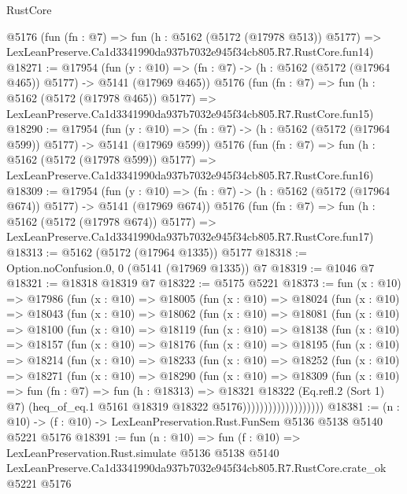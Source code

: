 \begin{lexlean}{RustCore}
\begin{coremodule}
    @5176
    (fun (fn : @7) =>
    fun (h : @5162 (@5172 (@17978 @513)) @5177) =>
    LexLeanPreserve.Ca1d3341990da937b7032e945f34cb805.R7.RustCore.fun14)
@18271 := @17954
    (fun (y : @10) => (fn : @7) -> (h : @5162 (@5172 (@17964 @465)) @5177) -> @5141 (@17969 @465))
    @5176
    (fun (fn : @7) =>
    fun (h : @5162 (@5172 (@17978 @465)) @5177) =>
    LexLeanPreserve.Ca1d3341990da937b7032e945f34cb805.R7.RustCore.fun15)
@18290 := @17954
    (fun (y : @10) => (fn : @7) -> (h : @5162 (@5172 (@17964 @599)) @5177) -> @5141 (@17969 @599))
    @5176
    (fun (fn : @7) =>
    fun (h : @5162 (@5172 (@17978 @599)) @5177) =>
    LexLeanPreserve.Ca1d3341990da937b7032e945f34cb805.R7.RustCore.fun16)
@18309 := @17954
    (fun (y : @10) => (fn : @7) -> (h : @5162 (@5172 (@17964 @674)) @5177) -> @5141 (@17969 @674))
    @5176
    (fun (fn : @7) =>
    fun (h : @5162 (@5172 (@17978 @674)) @5177) =>
    LexLeanPreserve.Ca1d3341990da937b7032e945f34cb805.R7.RustCore.fun17)
@18313 := @5162 (@5172 (@17964 @1335)) @5177
@18318 := Option.noConfusion.{0, 0} (@5141 (@17969 @1335)) @7
@18319 := @1046 @7
@18321 := @18318 @18319 @7
@18322 := @5175 @5221
@18373 := fun (x : @10) =>
  @17986
    (fun (x : @10) =>
    @18005
      (fun (x : @10) =>
      @18024
        (fun (x : @10) =>
        @18043
          (fun (x : @10) =>
          @18062
            (fun (x : @10) =>
            @18081
              (fun (x : @10) =>
              @18100
                (fun (x : @10) =>
                @18119
                  (fun (x : @10) =>
                  @18138
                    (fun (x : @10) =>
                    @18157
                      (fun (x : @10) =>
                      @18176
                        (fun (x : @10) =>
                        @18195
                          (fun (x : @10) =>
                          @18214
                            (fun (x : @10) =>
                            @18233
                              (fun (x : @10) =>
                              @18252
                                (fun (x : @10) =>
                                @18271
                                  (fun (x : @10) =>
                                  @18290
                                    (fun (x : @10) =>
                                    @18309
                                      (fun (x : @10) =>
                                      fun (fn : @7) =>
                                      fun (h : @18313) =>
                                      @18321
                                        @18322
                                        (Eq.refl.{2} (Sort 1) @7)
                                        (heq_of_eq.{1} @5161 @18319 @18322 @5176)))))))))))))))))))
@18381 := (n : @10) -> (f : @10) -> LexLeanPreservation.Rust.FunSem @5136 @5138 @5140 @5221 @5176
@18391 := fun (n : @10) =>
  fun (f : @10) =>
  LexLeanPreservation.Rust.simulate
    @5136
    @5138
    @5140
    LexLeanPreserve.Ca1d3341990da937b7032e945f34cb805.R7.RustCore.crate_ok
    @5221
    @5176
\end{coremodule}
\end{lexlean}
